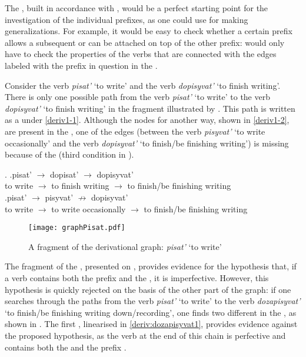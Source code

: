 The , built in accordance with , would be a perfect starting point for the investigation of the individual prefixes, as one could use  for making generalizations. For example, it would be easy to check whether a certain prefix allows a subsequent  or can be attached on top of the other prefix: would only have to check the properties of the verbs that are connected with the edges labeled with the prefix in question in the . 

Consider the verb \textit{pisat'} `to write' and the verb \textit{dopisyvat'} `to finish writing'. There is only one possible path from the verb \textit{pisat'} `to write' to the verb \textit{dopisyvat'} `to finish writing' in the  fragment illustrated by . This path is written as a  under \ref{deriv1-1}. Although the nodes for another way, shown in \ref{deriv1-2}, are present in the , one of the edges (between the verb \textit{pisyvat'} `to write occasionally' and the verb \textit{dopisyvat'} `to finish/be finishing writing') is missing because of the  (third condition in ).

\ex.\label{deriv1} \ag.\label{deriv1-1}pisat'\textsuperscript{\IPF} $\rightarrow$ dopisat'\textsuperscript{\PF} $\rightarrow$ dopisyvat'\textsuperscript{\IPF}\\
{to write} $\rightarrow$ {to finish writing} $\rightarrow$ {to finish/be finishing writing}\\
\bg.\label{deriv1-2}pisat'\textsuperscript{\IPF} $\rightarrow$ pisyvat'\textsuperscript{\IPF} $\nrightarrow$ dopisyvat'\\
{to write} $\rightarrow$ {to write occasionally} $\rightarrow$ {to finish/be finishing writing}\\

\begin{figure}
\texttt{[image: graphPisat.pdf]}
\caption{A fragment of the derivational graph: \textit{pisat'} `to write'\label{tree:dopisyvat}}
\end{figure}

The fragment of the , presented on , provides evidence for the hypothesis that, if a verb contains both the prefix  and the , it is imperfective. However, this hypothesis is quickly rejected on the basis of the other part of the graph: if one searches through the paths from the verb \textit{pisat'} `to write' to the verb \textit{dozapisyvat'} `to finish/be finishing writing down/recording', one finds two different  in the , as shown in . The first , linearised in \ref{deriv:dozapisyvat1}, provides evidence against the proposed hypothesis, as the verb at the end of this chain is perfective and contains both the  and the prefix .\largerpage[-1]

